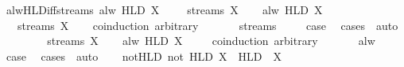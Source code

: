 \begin{isabellebody}
\isamarkupfalse%
\ alw{\isacharunderscore}HLD{\isacharunderscore}iff{\isacharunderscore}streams{\isacharcolon}\ {\isachardoublequoteopen}alw\ {\isacharparenleft}HLD\ X{\isacharparenright}\ {\isasymomega}\ {\isasymlongleftrightarrow}\ {\isasymomega}\ {\isasymin}\ streams\ X{\isachardoublequoteclose}\isanewline
%
\isadelimproof
%
\endisadelimproof
%
\isatagproof
{}\isamarkupfalse%
\isanewline
\ \ \isamarkupfalse%
\ {\isachardoublequoteopen}alw\ {\isacharparenleft}HLD\ X{\isacharparenright}\ {\isasymomega}{\isachardoublequoteclose}\ \isamarkupfalse%
\ \isamarkupfalse%
\ {\isachardoublequoteopen}{\isasymomega}\ {\isasymin}\ streams\ X{\isachardoublequoteclose}\isanewline
\ \ \isamarkupfalse%
\ {\isacharparenleft}coinduction\ arbitrary{\isacharcolon}\ {\isasymomega}{\isacharparenright}\isanewline
\ \ \ \ \isamarkupfalse%
\ {\isacharparenleft}streams\ {\isasymomega}{\isacharparenright}\ \isamarkupfalse%
\ \isamarkupfalse%
\ {\isacharquery}case\ \isamarkupfalse%
\ {\isacharparenleft}cases\ {\isasymomega}{\isacharparenright}\ auto\isanewline
\ \ \isamarkupfalse%
\isanewline
{}\isamarkupfalse%
\isanewline
\ \ \isamarkupfalse%
\ {\isachardoublequoteopen}{\isasymomega}\ {\isasymin}\ streams\ X{\isachardoublequoteclose}\ \isamarkupfalse%
\ \isamarkupfalse%
\ {\isachardoublequoteopen}alw\ {\isacharparenleft}HLD\ X{\isacharparenright}\ {\isasymomega}{\isachardoublequoteclose}\isanewline
\ \ \isamarkupfalse%
\ {\isacharparenleft}coinduction\ arbitrary{\isacharcolon}\ {\isasymomega}{\isacharparenright}\isanewline
\ \ \ \ \isamarkupfalse%
\ {\isacharparenleft}alw\ {\isasymomega}{\isacharparenright}\ \isamarkupfalse%
\ \isamarkupfalse%
\ {\isacharquery}case\ \isamarkupfalse%
\ {\isacharparenleft}cases\ {\isasymomega}{\isacharparenright}\ auto\isanewline
\ \ \isamarkupfalse%
\isanewline
{}\isamarkupfalse%
%
\endisatagproof
{\isafoldproof}%
%
\isadelimproof
\isanewline
%
\endisadelimproof
\isanewline
{}\isamarkupfalse%
\ not{\isacharunderscore}HLD{\isacharcolon}\ {\isachardoublequoteopen}not\ {\isacharparenleft}HLD\ X{\isacharparenright}\ {\isacharequal}\ HLD\ {\isacharparenleft}{\isacharminus}\ X{\isacharparenright}{\isachardoublequoteclose}\isanewline
%
\isadelimproof
\ \ %
\endisadelimproof
%

\end{isabellebody}
